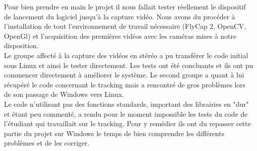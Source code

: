 Pour bien prendre en main le projet il nous fallait tester réellement le dispositif de lancement du logiciel jusqu'à la capture vidéo. Nous avons du  procéder à l'installation de tout l'environnement de travail nécessaire (FlyCap 2, OpenCV, OpenGl) et l’acquisition des premières vidéos avec les caméras mises à notre disposition. \\

Le groupe affecté à la capture des vidéos en stéréo a pu transférer le code initial sous Linux et ainsi le tester directement. Les tests ont été concluants et ils ont pu commencer directement à améliorer le système. Le second groupe a quant à lui récupéré le code concernant le tracking mais a rencontré de gros problèmes lors de son passage de Windows vers Linux. \\
Le code n'utilisant pas des fonctions standards, important des librairies en "dur" et étant peu commenté, a rendu pour le moment impossible les tests du code de l'étudiant qui travaillait sur le tracking. Pour y remédier ils ont du repasser cette partie du projet sur Windows le temps de bien comprendre les différents problèmes et de les corriger.
